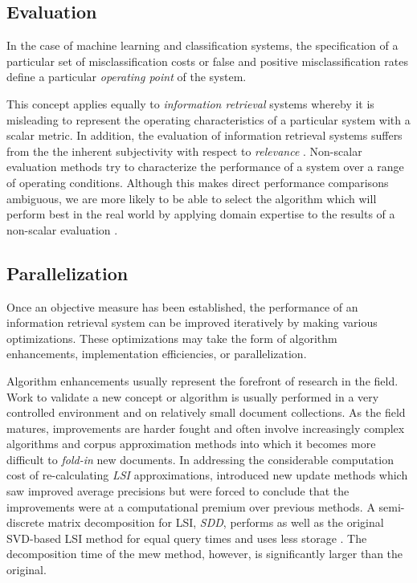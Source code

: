 \documentclass[10pt]{report}
\begin{document}
\subsection{Evaluation}
In the case of machine learning and classification systems, the
specification of a particular set of misclassification costs or false
and positive misclassification rates define a particular
\textit{operating point} of the system.

This concept applies equally to \textit{information retrieval} systems
whereby it is misleading to represent the operating characteristics of
a particular system with a scalar metric. In addition, the evaluation
of information retrieval systems suffers from the the inherent
subjectivity with respect to \textit{relevance}
\cite{RefWorks:72}. Non-scalar evaluation methods try to characterize
the performance of a system over a range of operating
conditions. Although this makes direct performance comparisons
ambiguous, we are more likely to be able to select the algorithm which
will perform best in the real world by applying domain expertise to
the results of a non-scalar evaluation \cite{RefWorks:32}.


\subsection{Parallelization}
Once an objective measure has been established, the performance of an
information retrieval system can be improved iteratively by making
various optimizations. These optimizations may take the form of
algorithm enhancements, implementation efficiencies, or
parallelization. 

Algorithm enhancements usually represent the forefront of research in
the field. Work to validate a new concept or algorithm is usually
performed in a very controlled environment and on relatively small
document collections. As the field matures, improvements are harder
fought and often involve increasingly complex algorithms and corpus
approximation methods into which it becomes more difficult to
\textit{fold-in} new documents. In addressing the considerable
computation cost of re-calculating \textit{LSI} \cite{RefWorks:102}
approximations, \cite{RefWorks:101} introduced new update methods
which saw improved average precisions but were forced to conclude that
the improvements were at a computational premium over previous
methods. A semi-discrete matrix decomposition for LSI, \textit{SDD},
performs as well as the original SVD-based LSI method for equal query
times and uses less storage \cite{RefWorks:99}. The decomposition time
of the mew method, however, is significantly larger than the original.
\end{document}

